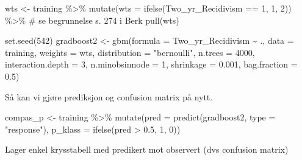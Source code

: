 \documentclass[
  letterpaper,
  DIV=11,
  numbers=noendperiod]{scrreprt}
\newenvironment{Shaded}{\begin{snugshade}}{\end{snugshade}}
\newcommand{\AttributeTok}[1]{\textcolor[rgb]{0.40,0.45,0.13}{#1}}
\newcommand{\CommentTok}[1]{\textcolor[rgb]{0.37,0.37,0.37}{#1}}
\newcommand{\DecValTok}[1]{\textcolor[rgb]{0.68,0.00,0.00}{#1}}
\newcommand{\FloatTok}[1]{\textcolor[rgb]{0.68,0.00,0.00}{#1}}
\newcommand{\FunctionTok}[1]{\textcolor[rgb]{0.28,0.35,0.67}{#1}}
\newcommand{\NormalTok}[1]{\textcolor[rgb]{0.00,0.23,0.31}{#1}}
\newcommand{\OtherTok}[1]{\textcolor[rgb]{0.00,0.23,0.31}{#1}}
\newcommand{\SpecialCharTok}[1]{\textcolor[rgb]{0.37,0.37,0.37}{#1}}
\newcommand{\StringTok}[1]{\textcolor[rgb]{0.13,0.47,0.30}{#1}}
\begin{document}
\begin{Shaded}
\begin{Highlighting}[]
\NormalTok{wts }\OtherTok{\textless{}{-}}\NormalTok{ training }\SpecialCharTok{\%\textgreater{}\%} 
  \FunctionTok{mutate}\NormalTok{(}\AttributeTok{wts =} \FunctionTok{ifelse}\NormalTok{(Two\_yr\_Recidivism }\SpecialCharTok{==} \DecValTok{1}\NormalTok{, }\DecValTok{1}\NormalTok{, }\DecValTok{2}\NormalTok{)) }\SpecialCharTok{\%\textgreater{}\%}   \CommentTok{\# se begrunnelse s. 274 i Berk }
  \FunctionTok{pull}\NormalTok{(wts)}

\FunctionTok{set.seed}\NormalTok{(}\DecValTok{542}\NormalTok{)}
\NormalTok{gradboost2 }\OtherTok{\textless{}{-}} \FunctionTok{gbm}\NormalTok{(}\AttributeTok{formula =}\NormalTok{ Two\_yr\_Recidivism }\SpecialCharTok{\textasciitilde{}}\NormalTok{ .,}
                 \AttributeTok{data =}\NormalTok{ training,}
                 \AttributeTok{weights =}\NormalTok{ wts, }
                 \AttributeTok{distribution =} \StringTok{"bernoulli"}\NormalTok{,}
                 \AttributeTok{n.trees =} \DecValTok{4000}\NormalTok{,}
                 \AttributeTok{interaction.depth =} \DecValTok{3}\NormalTok{,}
                 \AttributeTok{n.minobsinnode =} \DecValTok{1}\NormalTok{,}
                 \AttributeTok{shrinkage =} \FloatTok{0.001}\NormalTok{,}
                 \AttributeTok{bag.fraction =} \FloatTok{0.5}\NormalTok{)}
\end{Highlighting}
\end{Shaded}

Så kan vi gjøre prediksjon og confusion matrix på nytt.

\begin{Shaded}
\begin{Highlighting}[]
\NormalTok{compas\_p }\OtherTok{\textless{}{-}}\NormalTok{ training }\SpecialCharTok{\%\textgreater{}\%} 
  \FunctionTok{mutate}\NormalTok{(}\AttributeTok{pred =} \FunctionTok{predict}\NormalTok{(gradboost2, }\AttributeTok{type =} \StringTok{"response"}\NormalTok{), }
         \AttributeTok{p\_klass =} \FunctionTok{ifelse}\NormalTok{(pred }\SpecialCharTok{\textgreater{}} \FloatTok{0.5}\NormalTok{, }\DecValTok{1}\NormalTok{, }\DecValTok{0}\NormalTok{))}
\end{Highlighting}
\end{Shaded}

Lager enkel krysstabell med predikert mot observert (dvs confusion
matrix)

\begin{Shaded}
\end{Shaded}
\end{document}
